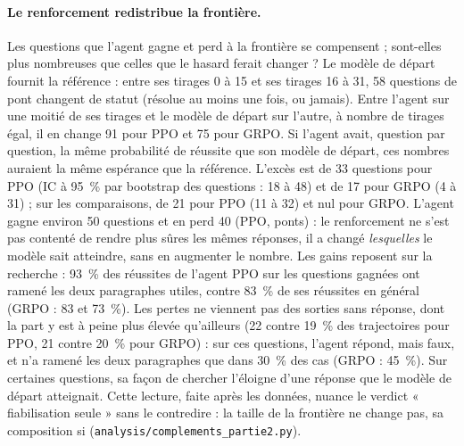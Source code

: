 \documentclass[11pt,a4paper]{article}
\begin{document}
\paragraph{Le renforcement redistribue la frontière.} Les questions que l'agent gagne et perd à la frontière se compensent ; sont-elles plus nombreuses que celles que le hasard ferait changer ? Le modèle de départ fournit la référence : entre ses tirages 0 à 15 et ses tirages 16 à 31, 58 questions de pont changent de statut (résolue au moins une fois, ou jamais). Entre l'agent sur une moitié de ses tirages et le modèle de départ sur l'autre, à nombre de tirages égal, il en change 91 pour PPO et 75 pour GRPO. Si l'agent avait, question par question, la même probabilité de réussite que son modèle de départ, ces nombres auraient la même espérance que la référence. L'excès est de 33 questions pour PPO (IC à 95~\% par bootstrap des questions : 18 à 48) et de 17 pour GRPO (4 à 31) ; sur les comparaisons, de 21 pour PPO (11 à 32) et nul pour GRPO. L'agent gagne environ 50 questions et en perd 40 (PPO, ponts) : le renforcement ne s'est pas contenté de rendre plus sûres les mêmes réponses, il a changé \emph{lesquelles} le modèle sait atteindre, sans en augmenter le nombre. Les gains reposent sur la recherche : 93~\% des réussites de l'agent PPO sur les questions gagnées ont ramené les deux paragraphes utiles, contre 83~\% de ses réussites en général (GRPO : 83 et 73~\%). Les pertes ne viennent pas des sorties sans réponse, dont la part y est à peine plus élevée qu'ailleurs (22 contre 19~\% des trajectoires pour PPO, 21 contre 20~\% pour GRPO) : sur ces questions, l'agent répond, mais faux, et n'a ramené les deux paragraphes que dans 30~\% des cas (GRPO : 45~\%). Sur certaines questions, sa façon de chercher l'éloigne d'une réponse que le modèle de départ atteignait. Cette lecture, faite après les données, nuance le verdict « fiabilisation seule » sans le contredire : la taille de la frontière ne change pas, sa composition si (\texttt{analysis/complements\_partie2.py}).
\end{document}
